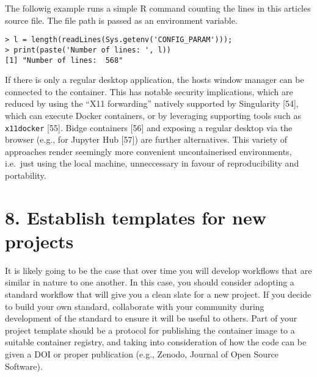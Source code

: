 \documentclass[10pt,letterpaper]{article}
\newenvironment{Shaded}{\begin{snugshade}}{\end{snugshade}}
\newcommand{\BuiltInTok}[1]{#1}
\newcommand{\ExtensionTok}[1]{#1}
\newcommand{\NormalTok}[1]{#1}
\newcommand{\StringTok}[1]{\textcolor[rgb]{0.31,0.60,0.02}{#1}}
\newcommand{\VariableTok}[1]{\textcolor[rgb]{0.00,0.00,0.00}{#1}}
\begin{document}
The followig example runs a simple R command counting the lines in this
articles source file. The file path is passed as an environment
variable.

\begin{Shaded}
\end{Shaded}

\begin{verbatim}
> l = length(readLines(Sys.getenv('CONFIG_PARAM')));
> print(paste('Number of lines: ', l))
[1] "Number of lines:  568"
\end{verbatim}

If there is only a regular desktop application, the hosts window manager
can be connected to the container. This has notable security
implications, which are reduced by using the ``X11 forwarding'' natively
supported by Singularity {[}54{]}, which can execute Docker containers,
or by leveraging supporting tools such as \texttt{x11docker} {[}55{]}.
Bidge containers {[}56{]} and exposing a regular desktop via the browser
(e.g., for Jupyter Hub {[}57{]}) are further alternatives. This variety
of approaches render seemingly more convenient uncontainerised
environments, i.e.~just using the local machine, unneccessary in favour
of reproducibility and portability.

\hypertarget{establish-templates-for-new-projects}{%
\section*{8. Establish templates for new
projects}\label{establish-templates-for-new-projects}}

  \label{rule:templates} 

It is likely going to be the case that over time you will develop
workflows that are similar in nature to one another. In this case, you
should consider adopting a standard workflow that will give you a clean
slate for a new project. If you decide to build your own standard,
collaborate with your community during development of the standard to
ensure it will be useful to others. Part of your project template should
be a protocol for publishing the container image to a suitable container
registry, and taking into consideration of how the code can be given a
DOI or proper publication (e.g., Zenodo, Journal of Open Source
Software).
\end{document}
